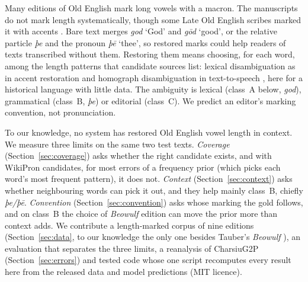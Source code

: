 \documentclass[11pt]{article}
\makeatletter
\renewcommand\section{\@startsection{section}{1}{\z@}{-2.5ex \@plus -.5ex \@minus -.2ex}{1.3ex \@plus .2ex}{\normalfont\Large\bfseries}}
\makeatother
\begin{document}
\section{Introduction}
Many editions of Old English mark long vowels with a macron. The manuscripts do not mark length systematically,
though some Late Old English scribes marked it with accents \cite{mokrowiecki2015}. Bare text merges
\emph{god} `God' and \emph{gōd} `good', or the relative particle \emph{þe} and the pronoun \emph{þē} `thee', so restored
marks could help readers of texts transcribed without them. Restoring
them means choosing, for each word, among the length patterns that candidate sources list: lexical
disambiguation as in accent restoration \cite{yarowsky1994} and homograph disambiguation in text-to-speech
\cite{gorman2018}, here for a historical language with little data. The
ambiguity is lexical (class~A below, \emph{god}), grammatical (class~B, \emph{þe}) or editorial (class~C). We predict an
editor's marking convention, not pronunciation.

To our knowledge, no system has restored Old English vowel length in context. We measure three limits on the same
two test texts. \emph{Coverage} (Section~\ref{sec:coverage}) asks whether the right candidate exists, and with WikiPron
candidates, for most errors of a frequency prior (which picks each word's most frequent pattern), it does not. \emph{Context}
(Section~\ref{sec:context}) asks whether neighbouring words can pick it out, and they help mainly class~B, chiefly
\emph{þe/þē}. \emph{Convention} (Section~\ref{sec:convention}) asks whose marking the gold follows, and on class~B the
choice of \textit{Beowulf} edition can move the prior more than context adds. We contribute a length-marked corpus of nine
editions (Section~\ref{sec:data}, to our knowledge the only one besides Tauber's \textit{Beowulf} \cite{tauber2021}),
an evaluation that separates the three limits, a reanalysis of CharsiuG2P \cite{zhu2022} (Section~\ref{sec:errors})
and tested code whose one script recomputes every result here from the released data and model predictions (MIT licence).
\end{document}
